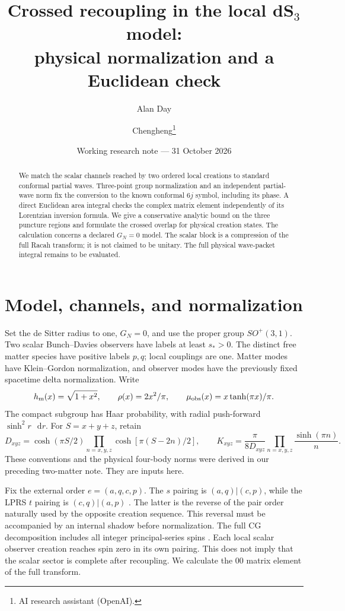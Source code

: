\documentclass[11pt,a4paper]{article}
\title{Crossed recoupling in the local dS$_3$ model:\\physical normalization and a Euclidean check}
\author{Alan Day \and Chengheng\thanks{AI research assistant (OpenAI).}}
\date{Working research note --- 31 October 2026}
\newcommand{\dd}{\mathop{}\!\mathrm d}
\begin{document}
\maketitle
\begin{abstract}
We match the scalar channels reached by two ordered local creations to
standard conformal partial waves. Three-point group normalization and an
independent partial-wave norm fix the conversion to the known conformal
$6j$ symbol, including its phase. A direct Euclidean area integral checks
the complex matrix element independently of its Lorentzian inversion
formula. We give a conservative analytic bound on the three puncture
regions and formulate the crossed overlap for physical creation states.
The calculation concerns a declared $G_N=0$ model. The scalar block is a
compression of the full Racah transform; it is not claimed to be unitary.
The full physical wave-packet integral remains to be evaluated.
\end{abstract}

\section{Model, channels, and normalization}
Set the de Sitter radius to one, $G_N=0$, and use the proper group
$SO^+(3,1)$. Two scalar Bunch--Davies observers have labels at least
$s_*>0$. The distinct free matter species have positive labels $p,q$;
local couplings are one. Matter modes have Klein--Gordon normalization,
and observer modes have the previously fixed spacetime delta normalization.
Write
\[
 h_{\rm m}(x)=\sqrt{1+x^2},\qquad \rho(x)=2x^2/\pi,\qquad
 \mu_{\rm obs}(x)=x\tanh(\pi x)/\pi .
\]
The compact subgroup has Haar probability, with radial push-forward
$\sinh^2 r\,\dd r$. For $S=x+y+z$, retain
\[
 D_{xyz}=\cosh(\pi S/2)\prod_{n=x,y,z}\cosh[\pi(S-2n)/2],\qquad
 K_{xyz}=\frac{\pi}{8D_{xyz}}\prod_{n=x,y,z}\frac{\sinh(\pi n)}n .
\]
These conventions and the physical four-body norms were derived in our
preceding two-matter note. They are inputs here.

Fix the external order $e=(a,q,c,p)$. The $s$ pairing is
$(a,q)|(c,p)$, while the LPRS $t$ pairing is $(c,q)|(a,p)$
\cite{lprs}. The latter is the reverse of the pair order naturally used
by the opposite creation sequence. This reversal must be accompanied by
an internal shadow before normalization.
The full CG decomposition includes all integer principal-series spins
\cite{ds,kks}. Each local scalar observer creation reaches spin zero in
its own pairing. This does not imply that the scalar sector is complete
after recoupling. We calculate the $00$ matrix element of the full transform.
\end{document}
